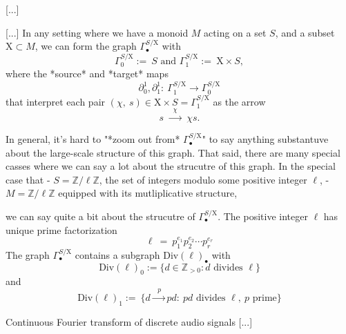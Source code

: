 \documentclass[11pt, a4paper]{article}
\newcommand{\Chi}{\mathrm{X}}
\begin{document}
\begin{section}{[...]}

\begin{subsection}{[...]}
In any setting where we have a monoid $M$ acting on a set $S$, and a subset $\Chi\subset M$, we can form the graph $\Gamma^{S/\Chi}_{\bullet}$ with
$$
\Gamma^{S/\Chi}_{0}:=\ S\text{\ \ \ \ \ \ and\ \ \ \ \ \ }\Gamma^{S/\Chi}_{1}:=\ \Chi\times S,
$$
where the *source* and *target* maps $$\partial^{1}_0,\partial^{1}_1:\ \Gamma^{S/\Chi}_1\!\!\longrightarrow\Gamma^{S/\Chi}_{0}$$ that interpret each pair $(\chi,\ s)\in \Chi\times S=\Gamma^{S/\Chi}_1$ as the arrow $$s\ \!\xrightarrow{\ \ \ \chi\ \ \ }\ \!\chi s.$$

In general, it's hard to "*zoom out from* $\Gamma^{S/\Chi}_{\bullet}$" to say anything substantuve about the large-scale structure of this graph. That said, there are many special casses where we can say a lot about the strucutre of this graph. In the special case that 
- $S=\mathbb{Z}/\ell\mathbb{Z}$, the set of integers modulo some positive integer $\ell$,
- $M=\mathbb{Z}/\ell\mathbb{Z}$ equipped with its mutliplicative structure,

we can say quite a bit about the strucutre of $\Gamma^{S/\Chi}_{\bullet}$. The positive integer $\ell$ has unique prime factorization $$\ell\ =\ p_{1}^{e_1}p_{2}^{e_2}\cdots p_{r}^{e_r}$$ The graph $\Gamma^{S/\Chi}_{\bullet}$ contains a subgraph $\text{Div}(\ell)_{\bullet}$ with $$\text{Div}(\ell)_{0}:=\{d\in\mathbb{Z}_{>0}:d\text{\ divides\ }\ell\}$$ and $$\text{Div}(\ell)_{1}:=\ \{d\xrightarrow{\ \ \ p\ \ }pd:\ pd\text{\ divides\ }\ell,\ p\text{\ prime}\}$$
\end{subsection}

\begin{subsection}{Continuous Fourier transform of discrete audio signals}
[...]
\end{subsection}

\end{section}

\cite{NeoRie}
\cite{Geo}
\cite{Cohn}




\end{document}
